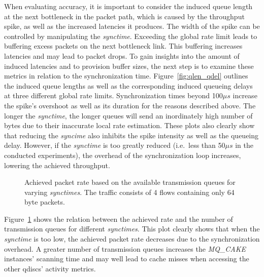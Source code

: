 %
When evaluating accuracy, it is important to consider the induced queue length at the next bottleneck in the packet path, which is caused by the throughput spike, as well as the increased latencies it produces.
%
The width of the spike can be controlled by manipulating the \textit{synctime}.
%
Exceeding the global rate limit leads to buffering excess packets on the next bottleneck link.
%
This buffering increases latencies and may lead to packet drops.
%
To gain insights into the amount of induced latencies and to provision buffer sizes, the next step is to examine these metrics in relation to the synchronization time. 
%
Figure~\ref{fig:qlen_qdel} outlines the induced queue lengths as well as the corresponding induced queueing delays at three different global rate limits.
%
Synchronization times beyond 100$\mu s$ increase the spike's overshoot as well as its duration for the reasons described above.
%
The longer the \textit{synctime}, the longer queues will send an inordinately high number of bytes due to their inaccurate local rate estimation.
%
These plots also clearly show that reducing the \textit{syncime} also inhibits the spike intensity as well as the queueing delay.
%
However, if the \textit{synctime} is too greatly reduced (i.e.\ less than 50$\mu s$ in the conducted experiments), the overhead of the synchronization loop increases, lowering the achieved throughput.
%
\begin{figure}[H]
    \centering
    
    \caption{Achieved packet rate based on the available transmission queues for varying \textit{synctimes}. The traffic consists of 4 flows containing only 64 byte packets.}\label{fig:sync_txq_64}
\end{figure}
Figure~\ref{fig:sync_txq_64} shows the relation between the achieved rate and the number of transmission queues for different \textit{synctimes}.
%
This plot clearly shows that when the \textit{synctime} is too low, the achieved packet rate decreases due to the synchronization overhead.
%
A greater number of transmission queues increases the \textit{MQ\_CAKE} instances' scanning time and may well lead to cache misses when accessing the other qdiscs' activity metrics.
%

